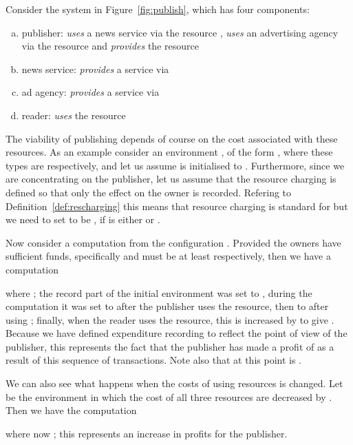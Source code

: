 \documentclass{LMCS}
\newcommand{\EndDefBox}{\null\hfill}
\newcommand{\boxHere}{\global\let\EndProof\empty\EndDefBox}
\begin{document}
\begin{exa}[Publishing]\label{ex:publishing}

  Consider the system  in Figure~\ref{fig:publish}, which has four components:
  \begin{enumerate}[(a)]
  \item publisher:  \emph{uses} a news service via the resource ,
        \emph{uses} an advertising agency via the resource  and \emph{provides} 
         the resource   

 \item news service: \emph{provides} a service via 

 \item ad agency: \emph{provides} a service via 

 \item reader: \emph{uses} the resource 
  \end{enumerate}
The viability of publishing depends of course on the cost associated with these resources.
As an example consider an environment , of the form 
, where these types are
 respectively, and let us assume 
 is initialised to . 
Furthermore, since we are concentrating on the publisher, let us assume that the 
resource charging is defined so that only the effect on the owner  is 
recorded. Refering to Definition~\ref{def:rescharging} this means that resource charging
is standard for  but 
we need to set  to be , if
 is either  or . 

Now consider a computation from the configuration . 
Provided the owners have sufficient funds, specifically  and  must be at least  respectively,
then we have a computation

where ; the record part of the initial
environment was set to , during the computation it was set to 
after the publisher uses the  resource, then to  after
using ; finally, when the reader uses the  resource,
this is increased by  to give .  Because we have defined
expenditure recording to reflect the point of view of the publisher, this
represents the fact that the publisher has made a profit of  as a
result of this sequence of transactions.  Note also that at this point
 is .


We can also see what happens when the costs of using resources is changed. 
Let  be the environment in which  the cost of all three resources are decreased 
by . Then we have the computation

where now ; this represents an increase in profits for the publisher. 
\boxHere
\end{exa}
\end{document}
